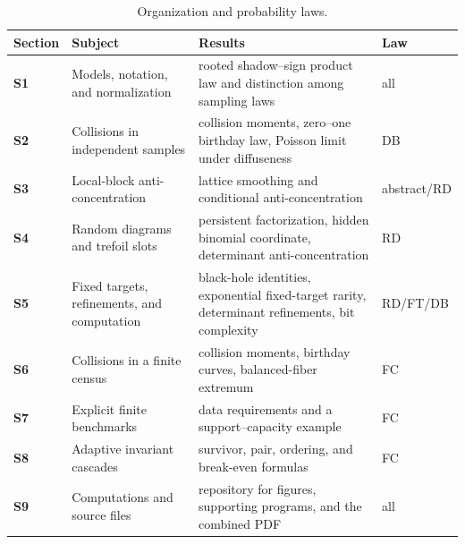 \documentclass[9pt,twoside]{pnas-new}
\theoremstyle{definition}
\theoremstyle{remark}
\begin{document}
\begin{table}[ht]
\centering
\caption{Organization and probability laws.}
\label{tab:si-contents-inventory}
\begin{tabularx}{\textwidth}{>{\bfseries}p{}>{\raggedright\arraybackslash}p{}>{\raggedright\arraybackslash}X>{\centering\arraybackslash}p{}}
\toprule
Section & Subject & Results & Law \\
\midrule
S1 & Models, notation, and normalization & rooted shadow--sign product law and distinction among sampling laws & all \\
S2 & Collisions in independent samples & collision moments, zero--one birthday law, Poisson limit under diffuseness & DB \\
S3 & Local-block anti-concentration & lattice smoothing and conditional anti-concentration & abstract/RD \\
S4 & Random diagrams and trefoil slots & persistent factorization, hidden binomial coordinate, determinant anti-concentration & RD \\
S5 & Fixed targets, refinements, and computation & black-hole identities, exponential fixed-target rarity, determinant refinements, bit complexity & RD/FT/DB \\
S6 & Collisions in a finite census & collision moments, birthday curves, balanced-fiber extremum & FC \\
S7 & Explicit finite benchmarks & data requirements and a support--capacity example & FC \\
S8 & Adaptive invariant cascades & survivor, pair, ordering, and break-even formulas & FC \\
S9 & Computations and source files & repository for figures, supporting programs, and the combined PDF & all \\
\bottomrule
\end{tabularx}
\end{table}
\end{document}
